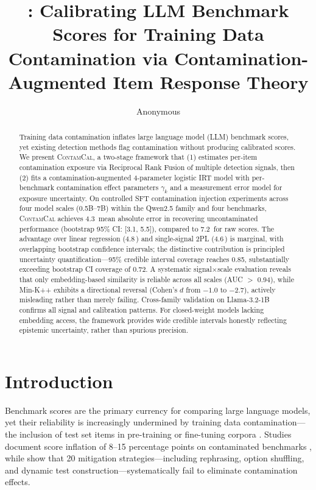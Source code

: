\documentclass[11pt,a4paper]{article}
\title{\method{}: Calibrating LLM Benchmark Scores for Training Data Contamination via Contamination-Augmented Item Response Theory}
\author{Anonymous}
\date{}
\newcommand{\method}{\textsc{ContamCal}}
\newcommand{\pp}{\,\text{pp}}
\begin{document}
\maketitle

\begin{abstract}
Training data contamination inflates large language model (LLM) benchmark scores, yet existing detection methods flag contamination without producing calibrated scores.
We present \method{}, a two-stage framework that (1) estimates per-item contamination exposure via Reciprocal Rank Fusion of multiple detection signals, then (2) fits a contamination-augmented 4-parameter logistic IRT model with per-benchmark contamination effect parameters $\gamma_k$ and a measurement error model for exposure uncertainty.
On controlled SFT contamination injection experiments across four model scales (0.5B--7B) within the Qwen2.5 family and four benchmarks, \method{} achieves 4.3\pp{} mean absolute error in recovering uncontaminated performance (bootstrap 95\% CI: [3.1, 5.5]), compared to 7.2\pp{} for raw scores.
The advantage over linear regression (4.8\pp{}) and single-signal 2PL (4.6\pp{}) is marginal, with overlapping bootstrap confidence intervals; the distinctive contribution is principled uncertainty quantification---95\% credible interval coverage reaches 0.85, substantially exceeding bootstrap CI coverage of 0.72.
A systematic signal$\times$scale evaluation reveals that only embedding-based similarity is reliable across all scales (AUC $>$ 0.94), while Min-K++ exhibits a directional reversal (Cohen's $d$ from $-1.0$ to $-2.7$), actively misleading rather than merely failing.
Cross-family validation on Llama-3.2-1B confirms all signal and calibration patterns.
For closed-weight models lacking embedding access, the framework provides wide credible intervals honestly reflecting epistemic uncertainty, rather than spurious precision.
\end{abstract}

\section{Introduction}
\label{sec:intro}

Benchmark scores are the primary currency for comparing large language models, yet their reliability is increasingly undermined by training data contamination---the inclusion of test set items in pre-training or fine-tuning corpora \citep{magar2022contamination,jacovi2023contamination,balloccu2024contamination}.
Studies document score inflation of 8--15 percentage points on contaminated benchmarks \citep{yang2023rethinking,oren2024proving}, while \citet{xu2024benchmarking} show that 20 mitigation strategies---including rephrasing, option shuffling, and dynamic test construction---systematically fail to eliminate contamination effects.
\end{document}
